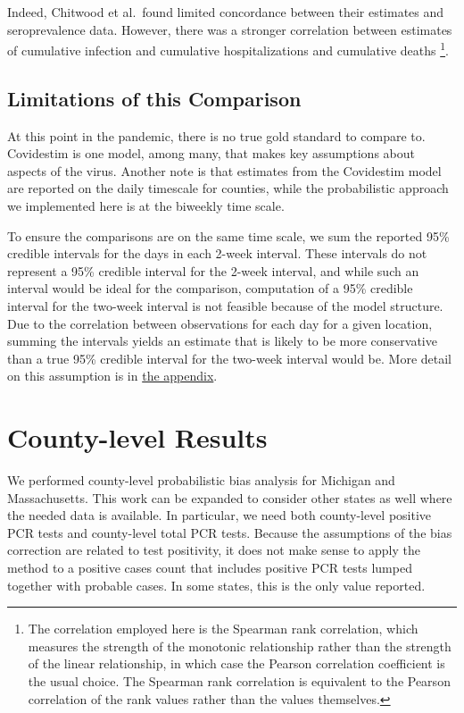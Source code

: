 \documentclass[12pt,twoside]{smiththesis}
\begin{document}
Indeed, Chitwood et al.~found limited concordance between their estimates and seroprevalence data. However, there was a stronger correlation between estimates of cumulative infection and cumulative hospitalizations and cumulative deaths \footnote{The correlation employed here is the Spearman rank correlation, which measures the strength of the monotonic relationship rather than the strength of the linear relationship, in which case the Pearson correlation coefficient is the usual choice. The Spearman rank correlation is equivalent to the Pearson correlation of the rank values rather than the values themselves. }.

\hypertarget{lims}{%
\subsection{Limitations of this Comparison}\label{lims}}

At this point in the pandemic, there is no true gold standard to compare to. Covidestim is one model, among many, that makes key assumptions about aspects of the virus. Another note is that estimates from the Covidestim model are reported on the daily timescale for counties, while the probabilistic approach we implemented here is at the biweekly time scale.

To ensure the comparisons are on the same time scale, we sum the reported 95\% credible intervals for the days in each 2-week interval. These intervals do not represent a 95\% credible interval for the 2-week interval, and while such an interval would be ideal for the comparison, computation of a 95\% credible interval for the two-week interval is not feasible because of the model structure. Due to the correlation between observations for each day for a given location, summing the intervals yields an estimate that is likely to be more conservative than a true 95\% credible interval for the two-week interval would be. More detail on this assumption is in \protect\hyperlink{conservativeintervals}{the appendix}.

\hypertarget{county-level-results}{%
\section{County-level Results}\label{county-level-results}}

We performed county-level probabilistic bias analysis for Michigan and Massachusetts. This work can be expanded to consider other states as well where the needed data is available. In particular, we need both county-level positive PCR tests and county-level total PCR tests. Because the assumptions of the bias correction are related to test positivity, it does not make sense to apply the method to a positive cases count that includes positive PCR tests lumped together with probable cases. In some states, this is the only value reported.
\end{document}
